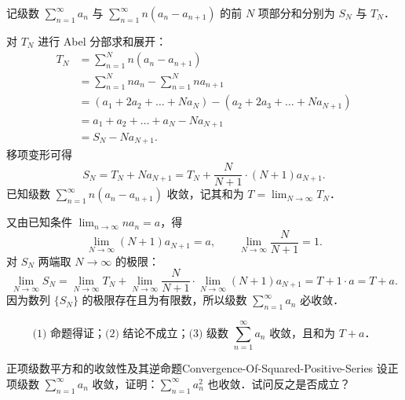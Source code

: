 \begin{solution}

    记级数 $\sum_{n=1}^\infty a_n$ 与 $\sum_{n=1}^\infty n(a_n - a_{n+1})$ 的前 $N$ 项部分和分别为 $S_N$ 与 $T_N$．

    对 $T_N$ 进行 Abel 分部求和展开：
    \begin{equation}
        \begin{aligned}
            T_N & = \sum_{n=1}^N n(a_n - a_{n+1})                                   \\
                & = \sum_{n=1}^N n a_n - \sum_{n=1}^N n a_{n+1}                     \\
                & = (a_1 + 2a_2 + \dots + N a_N) - (a_2 + 2a_3 + \dots + N a_{N+1}) \\
                & = a_1 + a_2 + \dots + a_N - N a_{N+1}                             \\
                & = S_N - N a_{N+1}.
        \end{aligned}
    \end{equation}
    移项变形可得
    \begin{equation}
        S_N = T_N + N a_{N+1} = T_N + \frac{N}{N+1} \cdot (N+1)a_{N+1}.
    \end{equation}
    已知级数 $\sum_{n=1}^\infty n(a_n - a_{n+1})$ 收敛，记其和为 $T = \lim_{N\to\infty} T_N$．

    又由已知条件 $\lim_{n\to\infty} n a_n = a$，得
    \begin{equation}
        \lim_{N\to\infty} (N+1)a_{N+1} = a, \qquad \lim_{N\to\infty} \frac{N}{N+1} = 1.
    \end{equation}
    对 $S_N$ 两端取 $N \to \infty$ 的极限：
    \begin{equation}
        \lim_{N\to\infty} S_N = \lim_{N\to\infty} T_N + \lim_{N\to\infty} \frac{N}{N+1} \cdot \lim_{N\to\infty} (N+1)a_{N+1} = T + 1 \cdot a = T + a.
    \end{equation}
    因为数列 $\{S_N\}$ 的极限存在且为有限数，所以级数 $\sum_{n=1}^\infty a_n$ 必收敛．

    \begin{equation}
        \boxed{\text{(1) 命题得证；(2) 结论不成立；(3) 级数 } \sum_{n=1}^\infty a_n \text{ 收敛，且和为 } T + a．}
    \end{equation}
\end{solution}

\begin{problem}{正项级数平方和的收敛性及其逆命题}{Convergence-Of-Squared-Positive-Series}
    设正项级数 $\sum_{n=1}^\infty a_n$ 收敛，证明：$\sum_{n=1}^\infty a_n^2$ 也收敛．试问反之是否成立？
\end{problem}

